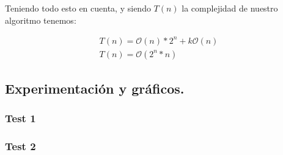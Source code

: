 Teniendo todo esto en cuenta, y siendo $T(n)$ la complejidad de nuestro algoritmo tenemos:

\begin{equation*}
\begin{array}{l}
T(n) = \mathcal{O}(n)*2^n + k\mathcal{O}(n)\\
T(n) = \mathcal{O}(2^n *n)
\end{array}
\end{equation*}



\vspace*{0.6cm}
\subsection{Experimentación y gráficos.}

\vspace*{0.3cm}


\subsubsection{Test 1}
\vspace*{0.3cm}

\vspace*{0.6cm}

\subsubsection{Test 2}

